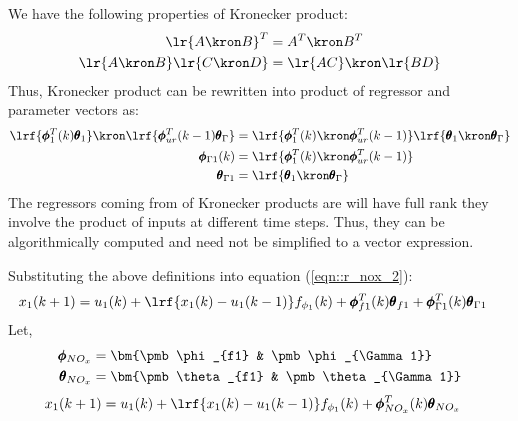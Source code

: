 We have the following properties of Kronecker product:
        \begin{align*}
                \lr{A \kron B}^T &= A^T \kron B^T \\
                \lr{A \kron B} \lr{C \kron D} &= \lr{AC} \kron \lr{BD}
        \end{align*}
Thus, Kronecker product can be rewritten into product of regressor and parameter vectors as:
\begin{align*}
        \lrf{\pmb \phi_1^T(k) \pmb \theta_1} \kron \lrf{\pmb \phi^T_{ur}(k-1) \pmb \theta_\Gamma} &=
             \lrf{ \pmb \phi_1^T(k) \kron \pmb \phi^T_{ur}(k-1) }
             \lrf{\pmb \theta_1 \kron \pmb \theta_\Gamma}\\
        \pmb \phi_{\Gamma 1} (k) &= \lrf{ \pmb \phi_1^T(k) \kron \pmb \phi^T_{ur}(k-1) } \\
        \pmb \theta_{\Gamma 1} &= \lrf{\pmb \theta_1 \kron \pmb \theta_\Gamma}
\end{align*}
The regressors coming from  of Kronecker products are will have full rank they involve the product of inputs at different time steps. Thus, they can be algorithmically computed and need not be simplified to a vector expression.

Substituting the above definitions into equation (\ref{eqn::r_nox_2}):
\begin{align}
         x_1(k+1) &=  u_1(k)  + \lrf{{x_1(k) - u_1(k-1)}} f_{\phi_1}(k) +
                     \pmb \phi_{f1}^T(k) \pmb \theta_{f1} +
                     \pmb \phi_{\Gamma 1}^T(k) \pmb \theta_{\Gamma 1}
        \label{eqn::r_nox_3}
\end{align}
Let,
\begin{align}
        \pmb \phi_{NO_x} &= \bm{\pmb \phi_{f1} & \pmb \phi_{\Gamma 1}}\\
        \pmb \theta_{NO_x} &= \bm{\pmb \theta_{f1} & \pmb \theta_{\Gamma 1}}
\end{align}
\begin{align}
          x_1(k+1) &=  u_1(k)  + \lrf{{x_1(k) - u_1(k-1)}} f_{\phi_1}(k) +
                     \pmb \phi_{NO_x}^T (k) \pmb \theta_{NO_x}
        \label{eqn::r_nox_regression}
\end{align}




